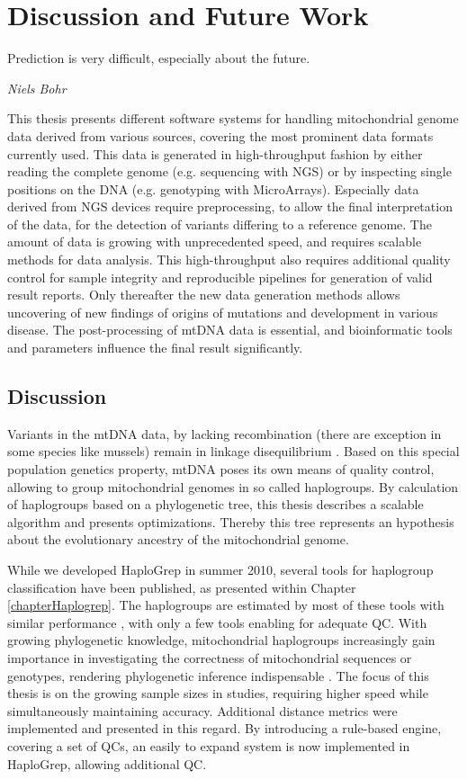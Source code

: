 \chapter{Discussion and Future Work}
\label{outlook}
\epigraph{Prediction is very difficult, especially about the future.}{\textit{Niels Bohr}}
This thesis presents different software systems for handling mitochondrial genome data derived from various sources, covering the most prominent data formats currently used. This data is generated in high-throughput fashion by either reading the complete genome (e.g. sequencing with NGS) or by inspecting single positions on the DNA (e.g. genotyping with MicroArrays). Especially data derived from NGS devices require preprocessing, to allow the final interpretation of the data, for the detection of variants differing to a reference genome. The amount of data is growing with unprecedented speed, and requires scalable methods for data analysis. This high-throughput also requires additional quality control for sample integrity and reproducible pipelines for generation of valid result reports. Only thereafter the new data generation methods allows uncovering of new findings of origins of mutations and development in various disease. The post-processing of mtDNA data is essential, and bioinformatic tools and parameters influence the final result significantly. 
\section{Discussion}
\label{disc:sec1}
Variants in the mtDNA data, by lacking recombination (there are exception in some species like mussels) remain in linkage disequilibrium \cite{Wallace2013}. Based on this special population genetics property, mtDNA poses its own means of quality control, allowing to group mitochondrial genomes in so called haplogroups. By calculation of haplogroups based on a phylogenetic tree, this thesis describes a scalable algorithm and presents optimizations.  Thereby this tree represents an hypothesis about the evolutionary ancestry of the mitochondrial genome. 

While we developed HaploGrep in summer 2010, several tools for haplogroup classification  have been published, as presented within Chapter \ref{chapterHaplogrep}. The haplogroups are estimated by most of these tools with similar performance \cite{Bandelt2012}, with only a few tools enabling for adequate QC. With growing phylogenetic knowledge, mitochondrial haplogroups increasingly gain importance in investigating the correctness of mitochondrial sequences or genotypes, rendering phylogenetic inference indispensable \cite{weissensteiner2016haplogrep}. The focus of this thesis is on the growing sample sizes in studies, requiring higher speed while simultaneously maintaining accuracy. 
Additional distance metrics were implemented and presented in this regard. By introducing a rule-based engine, covering a set of QCs, an easily to expand system is now implemented in HaploGrep, allowing additional QC. 

